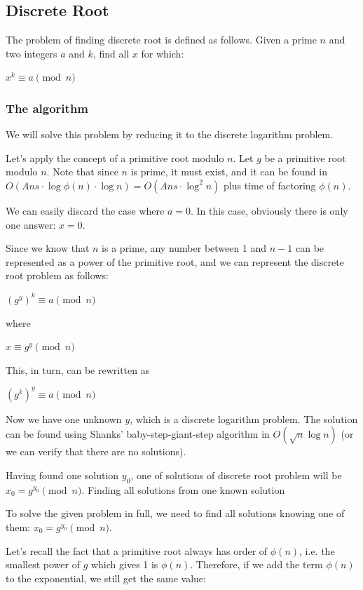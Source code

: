 \documentclass[8pt, a4paper, oneside, twocolumn]{extarticle}
\begin{document}
\subsection{Discrete Root}

The problem of finding discrete root is defined as follows. Given a prime $n$ and two integers $a$ and $k$, find all $x$ for which:

$x^k \equiv a \pmod n$
\subsubsection{The algorithm}

We will solve this problem by reducing it to the discrete logarithm problem.

Let's apply the concept of a primitive root modulo $n$. Let $g$ be a primitive root modulo $n$. Note that since $n$ is prime, it must exist, and it can be found in $O(Ans \cdot \log \phi (n) \cdot \log n) = O(Ans \cdot \log^2 n)$ plus time of factoring $\phi (n)$.

We can easily discard the case where $a = 0$. In this case, obviously there is only one answer: $x = 0$.

Since we know that $n$ is a prime, any number between 1 and $n-1$ can be represented as a power of the primitive root, and we can represent the discrete root problem as follows:

$(g^y)^k \equiv a \pmod n$

where

$x \equiv g^y \pmod n$

This, in turn, can be rewritten as

$(g^k)^y \equiv a \pmod n$

Now we have one unknown $y$, which is a discrete logarithm problem. The solution can be found using Shanks' baby-step-giant-step algorithm in $O(\sqrt {n} \log n)$ (or we can verify that there are no solutions).

Having found one solution $y_0$, one of solutions of discrete root problem will be $x_0 = g^{y_0} \pmod n$.
Finding all solutions from one known solution

To solve the given problem in full, we need to find all solutions knowing one of them: $x_0 = g^{y_0} \pmod n$.

Let's recall the fact that a primitive root always has order of $\phi (n)$, i.e. the smallest power of $g$ which gives 1 is $\phi (n)$. Therefore, if we add the term $\phi (n)$ to the exponential, we still get the same value:
\end{document}
